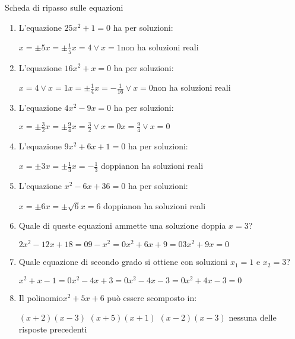 \begin{esercizio}[\Ast]
 \label{ese:3.178}
 Scheda di ripasso sulle equazioni
\begin{enumerate}
	\item L'equazione $25x^{2} + 1 = 0$ ha per soluzioni:

\boxA\quad $ x = \pm 5 $\qquad \boxB\quad $x = \pm \frac{1}{5}$\qquad\boxC\quad $x = 4 \vee x = 1$\qquad\boxD\quad non ha soluzioni reali

	\item L'equazione $16x^{2} + x = 0$ ha per soluzioni:

\boxA\quad $ x = 4 \vee x = 1 $\quad \boxB\quad $x = \pm \frac{1}{4}$\quad\boxC\quad $x =-\frac{1}{16} \vee x = 0$\quad\boxD\quad non ha soluzioni reali

	\item L'equazione $4x^{2}-9x = 0$ ha per soluzioni:

\boxA\quad $ x = \pm \frac{3}{2} $\qquad \boxB\quad $x = \pm \frac{9}{4}$\qquad\boxC\quad $x = \frac{3}{2} \vee x = 0$\qquad\boxD\quad $x = \frac{9}{4} \vee x = 0$

	\item L'equazione $9x^{2} + 6x + 1 = 0$ ha per soluzioni:

\boxA\quad $x = \pm 3$\qquad\boxB\quad $x = \pm \frac{1}{3}$\qquad\boxC\quad $x =-\frac{1}{3}$ doppia\qquad\boxD\quad non ha soluzioni reali

	\item L'equazione $x^{2}-6x + 36 = 0$ ha per soluzioni:

\boxA\quad $x = \pm 6$\qquad\boxB\quad $x = \pm \sqrt{6}$\qquad\boxC\quad $x =6$ doppia\qquad\boxD\quad non ha soluzioni reali

	\item Quale di queste equazioni ammette una soluzione doppia $ x=3 $?

\boxA\quad $2x^{2}-12x + 18 = 0$\quad\boxB\quad $9-x^{2} = 0$\quad\boxC\quad $x^{2} + 6x + 9 = 0$\quad\boxD\quad $ 3x^{2} + 9x = 0 $

	\item Quale equazione di secondo grado si ottiene con soluzioni $ x_1=1 $ e $ x_2=3 $?

\boxA\quad $x^{2} + x-1 = 0$\quad\boxB\quad $x^{2}-4x + 3 = 0$\quad\boxC\quad $x^{2}-4x-3 = 0$\quad\boxD\quad $ x^{2} + 4x-3 = 0 $

	\item Il polinomio$x^{2} + 5x + 6$ può essere scomposto in:

\boxA\; $(x + 2) (x-3)$\quad\boxB\; $(x + 5) (x + 1)$\quad\boxC\; $(x-2) (x-3)$\quad\boxD\; nessuna delle risposte precedenti


\end{enumerate}
\end{esercizio}
